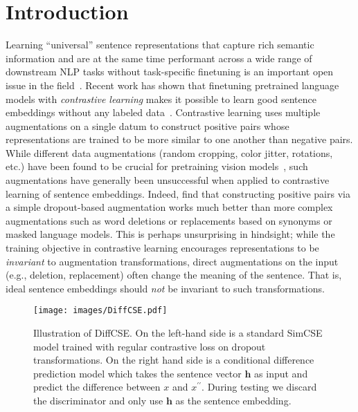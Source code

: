 \documentclass[11pt]{article}
\begin{document}
\section{Introduction}
\vspace{-1mm}
Learning ``universal'' sentence representations that capture rich semantic information and are at the same time performant across a wide range of downstream NLP tasks without task-specific finetuning is an important open issue in the field~\cite{conneau2017supervised, cer2018universal, kiros2015skip-thought, logeswaran2018an-quick-thought, giorgi2020declutr, yan2021consert, gao2021simcse}. Recent work has shown that finetuning pretrained language models with  \emph{contrastive learning} makes it possible to learn good sentence embeddings without  any labeled data~\cite{giorgi2020declutr, yan2021consert, gao2021simcse}. Contrastive learning uses multiple augmentations on a single datum to construct positive pairs whose representations are trained to be more similar to one another than negative pairs. While different data augmentations (random cropping, color jitter, rotations, etc.) have been found to be crucial for pretraining vision models~\cite{chen2020simple}, such augmentations have generally been unsuccessful when applied to contrastive learning of sentence embeddings. Indeed,  \citet{gao2021simcse} find that constructing positive pairs via a simple dropout-based augmentation works much better than more complex augmentations such as word deletions or replacements based on synonyms or masked language models. This is perhaps unsurprising in hindsight; while the training objective in contrastive learning encourages representations to be \emph{invariant} to augmentation transformations, direct augmentations on the input (e.g., deletion, replacement) often change the meaning of the sentence. That is, ideal sentence embeddings should \emph{not} be invariant to such transformations.


\begin{figure*}[!h]
    \centering
        \vspace{-2mm}
    \texttt{[image: images/DiffCSE.pdf]}
    \caption{Illustration of DiffCSE. On the left-hand side is a standard SimCSE model trained with regular contrastive loss on dropout transformations. On the right hand side is a conditional difference prediction model which takes the sentence vector $\mathbf{h}$ as input and predict the difference between $x$ and $x^{\prime\prime}$. During testing we discard the discriminator and only use $\mathbf{h}$ as the sentence embedding.}
    \label{fig:diffcse}
    \vspace{-2mm}
\end{figure*}
\end{document}
